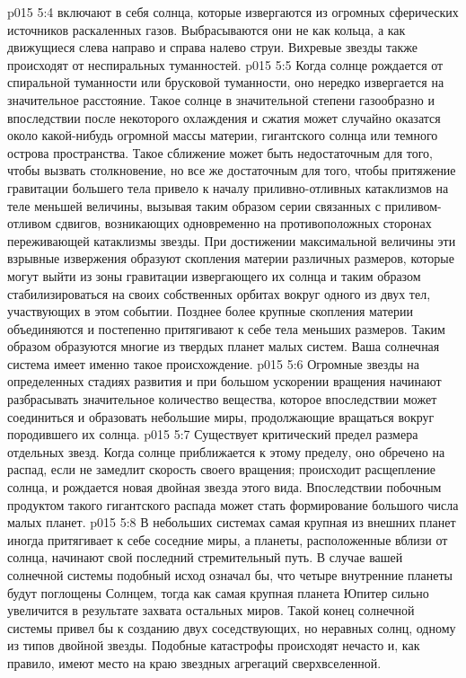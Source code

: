 \vs p015 5:4 \pc {}\bibnobreakspace {} включают в себя солнца, которые извергаются из огромных сферических источников раскаленных газов. Выбрасываются они не как кольца, а как движущиеся слева направо и справа налево струи. Вихревые звезды также происходят от неспиральных туманностей.
\vs p015 5:5 \pc {}\bibnobreakspace {} Когда солнце рождается от спиральной туманности или брусковой туманности, оно нередко извергается на значительное расстояние. Такое солнце в значительной степени газообразно и впоследствии после некоторого охлаждения и сжатия может случайно оказатся около какой\hyp{}нибудь огромной массы материи, гигантского солнца или темного острова пространства. Такое сближение может быть недостаточным для того, чтобы вызвать столкновение, но все же достаточным для того, чтобы притяжение гравитации большего тела привело к началу приливно\hyp{}отливных катаклизмов на теле меньшей величины, вызывая таким образом серии связанных с приливом\hyp{}отливом сдвигов, возникающих одновременно на противоположных сторонах переживающей катаклизмы звезды. При достижении максимальной величины эти взрывные извержения образуют скопления материи различных размеров, которые могут выйти из зоны гравитации извергающего их солнца и таким образом стабилизироваться на своих собственных орбитах вокруг одного из двух тел, участвующих в этом событии. Позднее более крупные скопления материи объединяются и постепенно притягивают к себе тела меньших размеров. Таким образом образуются многие из твердых планет малых систем. Ваша солнечная система имеет именно такое происхождение.
\vs p015 5:6 \pc {}\bibnobreakspace {} Огромные звезды на определенных стадиях развития и при большом ускорении вращения начинают разбрасывать значительное количество вещества, которое впоследствии может соединиться и образовать небольшие миры, продолжающие вращаться вокруг породившего их солнца.
\vs p015 5:7 \pc {}\bibnobreakspace {} Существует критический предел размера отдельных звезд. Когда солнце приближается к этому пределу, оно обречено на распад, если не замедлит скорость своего вращения; происходит расщепление солнца, и рождается новая двойная звезда этого вида. Впоследствии побочным продуктом такого гигантского распада может стать формирование большого числа малых планет.
\vs p015 5:8 \pc {}\bibnobreakspace {} В небольших системах самая крупная из внешних планет иногда притягивает к себе соседние миры, а планеты, расположенные вблизи от солнца, начинают свой последний стремительный путь. В случае вашей солнечной системы подобный исход означал бы, что четыре внутренние планеты будут поглощены Солнцем, тогда как самая крупная планета Юпитер сильно увеличится в результате захвата остальных миров. Такой конец солнечной системы привел бы к созданию двух соседствующих, но неравных солнц, одному из типов двойной звезды. Подобные катастрофы происходят нечасто и, как правило, имеют место на краю звездных агрегаций сверхвселенной.
